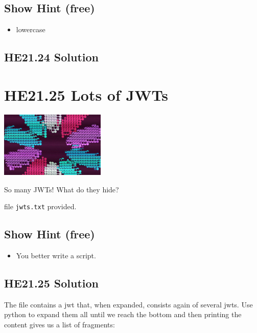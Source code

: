 \documentclass[english,a4paper,nols,noindent]{tufte-handout}
\begin{document}
\subsection{Show Hint (free)}
\begin{itemize}
\item lowercase
\end{itemize}

\hypertarget{he21.24-solution}{%
\subsection{HE21.24 Solution}\label{he21.24-solution}}

\noindent 


\hypertarget{he21.25}{%
  \section{HE21.25 Lots of JWTs}
  \label{he21.25}}
\begin{marginfigure}
    \includegraphics[width=50mm]{images/challenge25.jpg}
\end{marginfigure}

\noindent So many JWTs! What do they hide?

file \verb+jwts.txt+ provided.

\subsection{Show Hint (free)}
\begin{itemize}
\item You better write a script.
\end{itemize}

\hypertarget{he21.25-solution}{%
\subsection{HE21.25 Solution}\label{he21.25-solution}}

\noindent The file contains a jwt that, when expanded, consists again of
several jwts.  Use python to expand them all until we reach the bottom and then
printing the content gives us a list of fragments:
\end{document}
